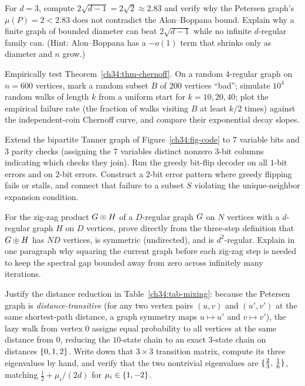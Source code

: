 \begin{exercise}
For $d=3$, compute $2\sqrt{d-1}=2\sqrt{2}\approx 2.83$ and verify why the Petersen graph's $\mu(P)=2<2.83$ does not contradict the Alon--Boppana bound. Explain why a finite graph of bounded diameter can beat $2\sqrt{d-1}$ while no infinite $d$-regular family can. (Hint: Alon--Boppana has a $-o(1)$ term that shrinks only as diameter and $n$ grow.)
\end{exercise}

\begin{exercise}
Empirically test Theorem~\ref{ch34:thm-chernoff}. On a random $4$-regular graph on $n=600$ vertices, mark a random subset $B$ of $200$ vertices ``bad''; simulate $10^4$ random walks of length $k$ from a uniform start for $k=10,20,40$; plot the empirical failure rate (the fraction of walks visiting $B$ at least $k/2$ times) against the independent-coin Chernoff curve, and compare their exponential decay slopes.
\end{exercise}

\begin{exercise}
Extend the bipartite Tanner graph of Figure~\ref{ch34:fig-code} to $7$ variable bits and $3$ parity checks (assigning the $7$ variables distinct nonzero $3$-bit columns indicating which checks they join). Run the greedy bit-flip decoder on all $1$-bit errors and on $2$-bit errors. Construct a $2$-bit error pattern where greedy flipping fails or stalls, and connect that failure to a subset $S$ violating the unique-neighbor expansion condition.
\end{exercise}

\begin{exercise}
For the zig-zag product $G\mathbin{\circledcirc} H$ of a $D$-regular graph $G$ on $N$ vertices with a $d$-regular graph $H$ on $D$ vertices, prove directly from the three-step definition that $G\mathbin{\circledcirc} H$ has $ND$ vertices, is symmetric (undirected), and is $d^2$-regular. Explain in one paragraph why squaring the current graph before each zig-zag step is needed to keep the spectral gap bounded away from zero across infinitely many iterations.
\end{exercise}

\begin{exercise}
Justify the distance reduction in Table~\ref{ch34:tab-mixing}: because the Petersen graph is \emph{distance-transitive} (for any two vertex pairs $(u,v)$ and $(u',v')$ at the same shortest-path distance, a graph symmetry maps $u\mapsto u'$ and $v\mapsto v'$), the lazy walk from vertex $0$ assigns equal probability to all vertices at the same distance from $0$, reducing the $10$-state chain to an exact $3$-state chain on distances $\{0,1,2\}$. Write down that $3\times 3$ transition matrix, compute its three eigenvalues by hand, and verify that the two nontrivial eigenvalues are $\{\tfrac{2}{3},\,\tfrac{1}{6}\}$, matching $\tfrac{1}{2}+\mu_i/(2d)$ for $\mu_i\in\{1,-2\}$.
\end{exercise}

